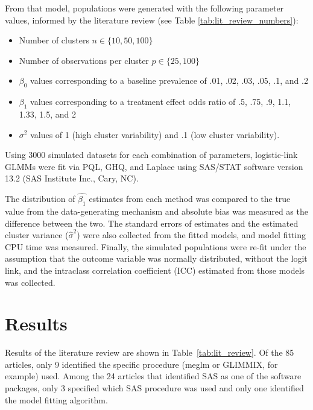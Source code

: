 \documentclass{article}
\begin{document}
\begin{flushleft}
From that model, populations were generated with the following parameter values, informed by the literature review (see Table \ref{tab:lit_review_numbers}):
\begin{itemize}
    \item Number of clusters $n \in \{10, 50, 100\}$
    \item Number of observations per cluster $p \in \{25, 100\}$
    \item $\beta_0$ values corresponding to a baseline prevalence of .01, .02, .03, .05, .1, and .2
    \item $\beta_1$ values corresponding to a treatment effect odds ratio of .5, .75, .9, 1.1, 1.33, 1.5, and 2
    \item $\sigma^2$ values of 1 (high cluster variability) and .1 (low cluster variability).
\end{itemize}

Using 3000 simulated datasets for each combination of parameters, logistic-link GLMMs were fit via PQL, GHQ, and Laplace using SAS/STAT software version 13.2 (SAS Institute Inc., Cary, NC).

The distribution of $\hat{\beta_1}$ estimates from each method was compared to the true value from the data-generating mechanism and absolute bias was measured as the difference between the two. The standard errors of estimates and the estimated cluster variance ($\hat{\sigma}^2$) were also collected from the fitted models, and model fitting CPU time was measured. Finally, the simulated populations were re-fit under the assumption that the outcome variable was normally distributed, without the logit link, and the intraclass correlation coefficient (ICC) estimated from those models was collected.




\section{Results}

Results of the literature review are shown in Table~\ref{tab:lit_review}. Of the 85 articles, only 9 identified the specific procedure (meglm or GLIMMIX, for example) used. Among the 24 articles that identified SAS as one of the software packages, only 3 specified which SAS procedure was used and only one identified the model fitting algorithm.


\end{flushleft}
\end{document}
